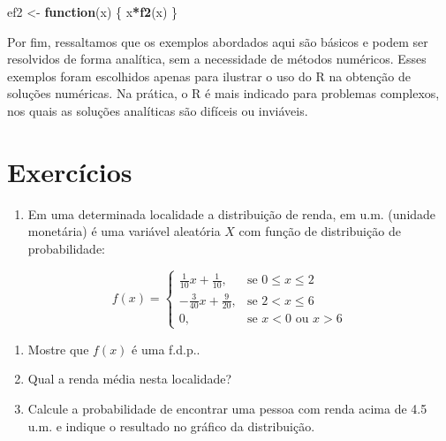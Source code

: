 \documentclass[
]{book}
\newenvironment{Shaded}{\begin{snugshade}}{\end{snugshade}}
\newcommand{\ControlFlowTok}[1]{\textcolor[rgb]{0.13,0.29,0.53}{\textbf{#1}}}
\newcommand{\DecValTok}[1]{\textcolor[rgb]{0.00,0.00,0.81}{#1}}
\newcommand{\DocumentationTok}[1]{\textcolor[rgb]{0.56,0.35,0.01}{\textbf{\textit{#1}}}}
\newcommand{\FunctionTok}[1]{\textcolor[rgb]{0.13,0.29,0.53}{\textbf{#1}}}
\newcommand{\NormalTok}[1]{#1}
\newcommand{\OtherTok}[1]{\textcolor[rgb]{0.56,0.35,0.01}{#1}}
\newcommand{\SpecialCharTok}[1]{\textcolor[rgb]{0.81,0.36,0.00}{\textbf{#1}}}
\providecommand{\tightlist}{%
  \setlength{\itemsep}{0pt}\setlength{\parskip}{0pt}}
\begin{document}
\begin{Shaded}
\begin{Highlighting}[]
\NormalTok{ef2 }\OtherTok{\textless{}{-}} \ControlFlowTok{function}\NormalTok{(x) \{}
\NormalTok{  x}\SpecialCharTok{*}\FunctionTok{f2}\NormalTok{(x)}
\NormalTok{\}}
\end{Highlighting}
\end{Shaded}

\begin{Shaded}
\end{Shaded}

Por fim, ressaltamos que os exemplos abordados aqui são básicos e podem ser resolvidos de forma analítica, sem a necessidade de métodos numéricos. Esses exemplos foram escolhidos apenas para ilustrar o uso do R na obtenção de soluções numéricas. Na prática, o R é mais indicado para problemas complexos, nos quais as soluções analíticas são difíceis ou inviáveis.

\section{Exercícios}\label{exercuxedcios-22}

\begin{enumerate}
\def\labelenumi{\arabic{enumi}.}
\tightlist
\item
  Em uma determinada localidade a distribuição de renda, em u.m. (unidade monetária) é uma variável aleatória \(X\) com função de distribuição de probabilidade:
\end{enumerate}

\[
f(x) = 
\begin{cases} 
\frac{1}{10}x + \frac{1}{10}, & \text{se } 0 \leq x \leq 2 \\[10pt]
-\frac{3}{40}x + \frac{9}{20}, & \text{se } 2 < x \leq 6 \\[10pt]
0, & \text{se } x < 0 \text{ ou } x > 6
\end{cases}
\]

\begin{enumerate}
\def\labelenumi{(\alph{enumi})}
\tightlist
\item
  Mostre que \(f(x)\) é uma f.d.p..
\item
  Qual a renda média nesta localidade?
\item
  Calcule a probabilidade de encontrar uma pessoa com renda acima de 4.5 u.m. e indique o resultado no gráfico da distribuição.
\end{enumerate}
\end{document}
